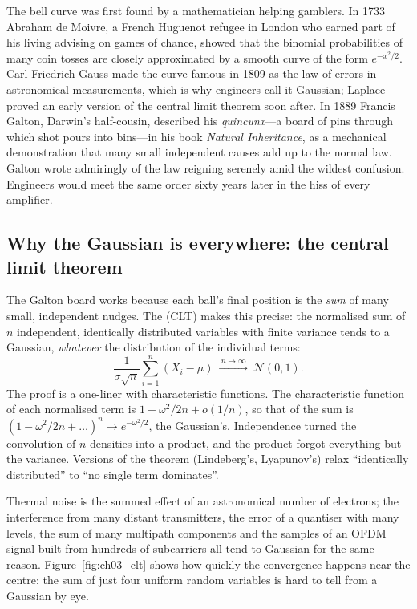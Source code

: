 \begin{history}
The bell curve was first found by a mathematician helping gamblers. In 1733 Abraham de Moivre, a
French Huguenot refugee in London who earned part of his living advising on games of chance,
showed that the binomial probabilities of many coin tosses are closely approximated by a smooth
curve of the form $e^{-x^2/2}$. Carl Friedrich Gauss made the curve famous in 1809 as the law of
errors in astronomical measurements, which is why engineers call it Gaussian; Laplace proved an
early version of the central limit theorem soon after. In 1889 Francis Galton, Darwin's
half-cousin, described his \emph{quincunx}---a board of pins through which shot pours into
bins---in his book \emph{Natural Inheritance}, as a mechanical demonstration that many small
independent causes add up to the normal law. Galton wrote admiringly of the law reigning serenely
amid the wildest confusion. Engineers would meet the same order sixty years later in the hiss of
every amplifier.
\end{history}

\subsection{Why the Gaussian is everywhere: the central limit theorem}

The Galton board works because each ball's final position is the \emph{sum} of many small,
independent nudges. The  (CLT) makes this precise: the normalised sum
of $n$ independent, identically distributed variables with finite variance tends to a Gaussian,
\emph{whatever} the distribution of the individual terms:
\begin{equation}
\frac{1}{\sigma\sqrt n}\sum_{i=1}^n(X_i-\mu)\ \xrightarrow{\ n\to\infty\ }\ \mathcal N(0,1).
\end{equation}
The proof is a one-liner with characteristic functions. The characteristic function of each
normalised term is $1-\omega^2/2n+o(1/n)$, so that of the sum is
$(1-\omega^2/2n+\dots)^n\to e^{-\omega^2/2}$, the Gaussian's. Independence turned the convolution
of $n$ densities into a product, and the product forgot everything but the variance. Versions of the
theorem (Lindeberg's, Lyapunov's) relax ``identically distributed'' to ``no single term dominates''.

Thermal noise is the summed effect of an astronomical number of electrons; the interference from
many distant transmitters, the error of a quantiser with many levels, the sum of many multipath
components and the samples of an OFDM signal built from hundreds of subcarriers all tend to Gaussian
for the same reason. Figure~\ref{fig:ch03_clt} shows how quickly the convergence happens near the
centre: the sum of just four uniform random variables is hard to tell from a Gaussian by eye.

